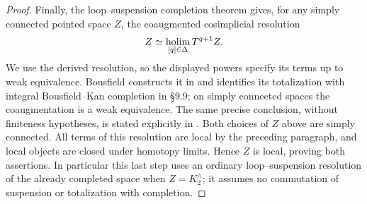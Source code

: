 \begin{proof}
Finally, the loop--suspension completion theorem gives, for any simply connected pointed space $Z$, the coaugmented cosimplicial resolution
\[
 Z\simeq\operatorname*{holim}_{[q]\in\Delta} T^{q+1}Z.
\]
We use the derived resolution, so the displayed powers specify its terms up to weak equivalence. Bousfield constructs it in \cite[\S7.9]{FGHBousfield2003} and identifies its totalization with integral Bousfield--Kan completion in \S9.9; on simply connected spaces the coaugmentation is a weak equivalence. The same precise conclusion, without finiteness hypotheses, is stated explicitly in \cite[Theorem 1.8(b)]{FGHBlomquistHarper2017}. Both choices of $Z$ above are simply connected. All terms of this resolution are local by the preceding paragraph, and local objects are closed under homotopy limits. Hence $Z$ is local, proving both assertions. In particular this last step uses an ordinary loop--suspension resolution of the already completed space when $Z=K^{\wedge}_2$; it assumes no commutation of suspension or totalization with completion.
\end{proof}
